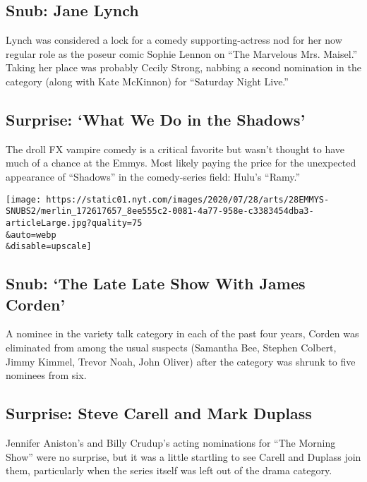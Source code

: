\hypertarget{snub-jane-lynch}{%
\subsection{Snub: Jane Lynch}\label{snub-jane-lynch}}

Lynch was considered a lock for a comedy supporting-actress nod for her
now regular role as the poseur comic Sophie Lennon on ``The Marvelous
Mrs. Maisel.'' Taking her place was probably Cecily Strong, nabbing a
second nomination in the category (along with Kate McKinnon) for
``Saturday Night Live.''

\hypertarget{surprise-what-we-do-in-the-shadows}{%
\subsection{Surprise: `What We Do in the
Shadows'}\label{surprise-what-we-do-in-the-shadows}}

The droll FX vampire comedy is a critical favorite but wasn't thought to
have much of a chance at the Emmys. Most likely paying the price for the
unexpected appearance of ``Shadows'' in the comedy-series field: Hulu's
``Ramy.''

\texttt{[image: https://static01.nyt.com/images/2020/07/28/arts/28EMMYS-SNUBS2/merlin\_172617657\_8ee555c2-0081-4a77-958e-c3383454dba3-articleLarge.jpg?quality=75\\\&auto=webp\\\&disable=upscale]}

\hypertarget{snub-the-late-late-show-with-james-corden}{%
\subsection{Snub: `The Late Late Show With James
Corden'}\label{snub-the-late-late-show-with-james-corden}}

A nominee in the variety talk category in each of the past four years,
Corden was eliminated from among the usual suspects (Samantha Bee,
Stephen Colbert, Jimmy Kimmel, Trevor Noah, John Oliver) after the
category was shrunk to five nominees from six.

\hypertarget{surprise-steve-carell-and-mark-duplass}{%
\subsection{Surprise: Steve Carell and Mark
Duplass}\label{surprise-steve-carell-and-mark-duplass}}

Jennifer Aniston's and Billy Crudup's acting nominations for ``The
Morning Show'' were no surprise, but it was a little startling to see
Carell and Duplass join them, particularly when the series itself was
left out of the drama category.

